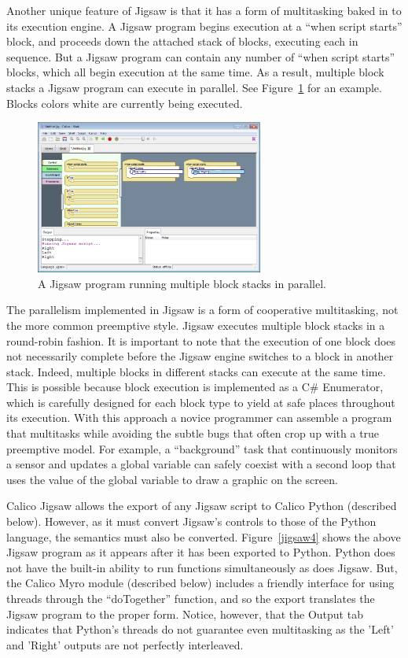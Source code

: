 \documentclass[preprint]{sigplanconf}
\begin{document}
Another unique feature of Jigsaw is that it has a form of multitasking
baked in to its execution engine. A Jigsaw program begins
execution at a ``when script starts'' block, and proceeds down the
attached stack of blocks, executing each in sequence. But a Jigsaw
program can contain any number of ``when script starts'' blocks, which
all begin execution at the same time. As a result, multiple block
stacks a Jigsaw program can execute in parallel. See Figure~\ref{jigsaw3} 
for an example. Blocks colors white are currently being executed. 

\begin{figure}[h!]
  \centering
    \includegraphics[width=75mm]{jigsaw3.eps} 
  \caption{A Jigsaw program running multiple block stacks in parallel.}
  \label{jigsaw3}
\end{figure}

The parallelism implemented in Jigsaw is a form of
cooperative multitasking, not the more common preemptive style. Jigsaw
executes multiple block stacks in a round-robin fashion. It is
important to note that the execution of one block does not necessarily
complete before the Jigsaw engine switches to a block in another
stack. Indeed, multiple blocks in different stacks can execute at the
same time. This is possible because block execution is implemented 
as a C\# Enumerator, which is carefully designed for each block type
to yield at safe places throughout its execution. With this
approach a novice programmer can assemble a program that
multitasks while avoiding the subtle bugs that often crop 
up with a true preemptive model. For example, a ``background'' task
that continuously monitors a sensor and updates a global variable 
can safely coexist with a second loop that uses the value of the global
variable to draw a graphic on the screen.

Calico Jigsaw allows the export of any Jigsaw script to Calico Python
(described below). However, as it must convert Jigsaw's controls to
those of the Python language, the semantics must also be
converted. Figure~\ref{jigsaw4} shows the above Jigsaw program as it
appears after it has been exported to Python. Python does not have the
built-in ability to run functions simultaneously as does Jigsaw. But,
the Calico Myro module (described below) includes a friendly interface
for using threads through the ``doTogether'' function, and so the
export translates the Jigsaw program to the proper form. Notice,
however, that the Output tab indicates that Python's threads do not
guarantee even multitasking as the 'Left' and 'Right' outputs are not
perfectly interleaved.
\end{document}
